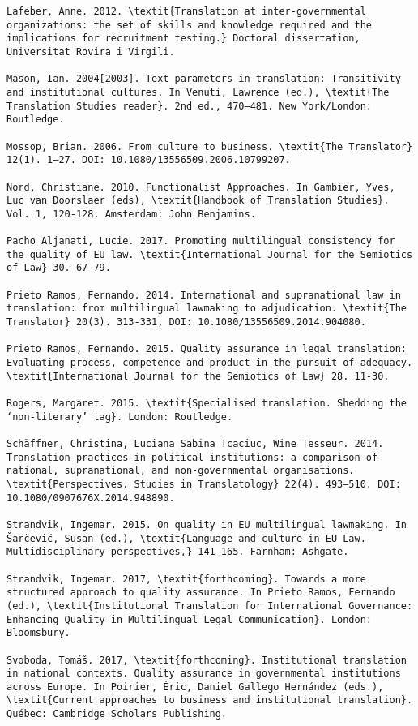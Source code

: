 \documentclass[output=paper]{langsci/langscibook}
\begin{document}
\begin{verbatim}
Lafeber, Anne. 2012. \textit{Translation at inter-governmental organizations: the set of skills and knowledge required and the implications for recruitment testing.} Doctoral dissertation, Universitat Rovira i Virgili.

Mason, Ian. 2004[2003]. Text parameters in translation: Transitivity and institutional cultures. In Venuti, Lawrence (ed.), \textit{The Translation Studies reader}. 2nd ed., 470–481. New York/London: Routledge.

Mossop, Brian. 2006. From culture to business. \textit{The Translator} 12(1). 1–27. DOI: 10.1080/13556509.2006.10799207.

Nord, Christiane. 2010. Functionalist Approaches. In Gambier, Yves, Luc van Doorslaer (eds), \textit{Handbook of Translation Studies}. Vol. 1, 120-128. Amsterdam: John Benjamins.

Pacho Aljanati, Lucie. 2017. Promoting multilingual consistency for the quality of EU law. \textit{International Journal for the Semiotics of Law} 30. 67–79.

Prieto Ramos, Fernando. 2014. International and supranational law in translation: from multilingual lawmaking to adjudication. \textit{The Translator} 20(3). 313-331, DOI: 10.1080/13556509.2014.904080.

Prieto Ramos, Fernando. 2015. Quality assurance in legal translation: Evaluating process, competence and product in the pursuit of adequacy. \textit{International Journal for the Semiotics of Law} 28. 11-30.

Rogers, Margaret. 2015. \textit{Specialised translation. Shedding the ‘non-literary’ tag}. London: Routledge.

Schäffner, Christina, Luciana Sabina Tcaciuc, Wine Tesseur. 2014. Translation practices in political institutions: a comparison of national, supranational, and non-governmental organisations. \textit{Perspectives. Studies in Translatology} 22(4). 493–510. DOI: 10.1080/0907676X.2014.948890. 

Strandvik, Ingemar. 2015. On quality in EU multilingual lawmaking. In Šarčević, Susan (ed.), \textit{Language and culture in EU Law. Multidisciplinary perspectives,} 141-165. Farnham: Ashgate.

Strandvik, Ingemar. 2017, \textit{forthcoming}. Towards a more structured approach to quality assurance. In Prieto Ramos, Fernando (ed.), \textit{Institutional Translation for International Governance: Enhancing Quality in Multilingual Legal Communication}. London: Bloomsbury.

Svoboda, Tomáš. 2017, \textit{forthcoming}. Institutional translation in national contexts. Quality assurance in governmental institutions across Europe. In Poirier, Éric, Daniel Gallego Hernández (eds.), \textit{Current approaches to business and institutional translation}. Québec: Cambridge Scholars Publishing.


\end{verbatim} 
\sloppy
\printbibliography[heading=subbibliography,notkeyword=this] 
\end{document}

